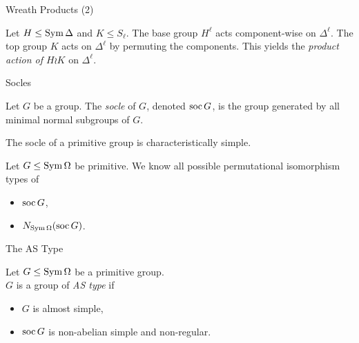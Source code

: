 
\begin{frame}{Wreath Products (2)}
    \begin{defn}
        Let $H \leq \operatorname{Sym} \Delta$ and $K \leq S_\ell$.
        The base group $H ^ \ell$ acts component-wise on $\Delta ^ \ell$.
        The top group $K$ acts on $\Delta ^ \ell$ by permuting the components.
        \pause
        This yields the \emph{product action of $H \wr K$} on $\Delta ^ \ell$.
    \end{defn}
\end{frame}

\begin{frame}{Socles}
    \begin{defn}
        Let $G$ be a group. The \emph{socle} of $G$, denoted $\operatorname{soc} G$,
        is the group generated by all minimal normal subgroups of $G$.
    \end{defn}
    \pause

    \begin{thm}
        The socle of a primitive group is characteristically simple.
    \end{thm}
    \pause

    \begin{thm}
        Let $G \leq \operatorname{Sym} \Omega$ be primitive.
        We know all possible permutational isomorphism types of
        \pause
        \vspace{-0.5em}
        \begin{itemize}
            \item
            $\operatorname{soc} G$,
            \pause
            \item
            $N_{\operatorname{Sym} \Omega}(\operatorname{soc} G)$.
        \end{itemize}
    \end{thm}
\end{frame}

\begin{frame}{The AS Type}
    \begin{defn}
        Let $G \leq \operatorname{Sym} \Omega$ be a primitive group.
        \\
        $G$ is a group of \emph{AS type} if
        \vspace{-0.5em}
        \pause
        \begin{itemize}
            \item
            $G$ is almost simple,
            \pause
            \item
            $\operatorname{soc} G$ is non-abelian simple and non-regular.
        \end{itemize}
    \end{defn}
\end{frame}

